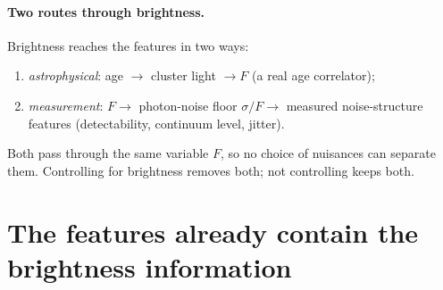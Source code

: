\documentclass[11pt]{article}
\begin{document}
\paragraph{Two routes through brightness.}
Brightness reaches the features in two ways:
\begin{enumerate}
  \item \emph{astrophysical}: age $\to$ cluster light $\to F$ (a real age correlator);
  \item \emph{measurement}: $F \to$ photon-noise floor $\sigma/F \to$ measured noise-structure
        features (detectability, continuum level, jitter).
\end{enumerate}
Both pass through the same variable $F$, so no choice of nuisances can separate them.
Controlling for brightness removes both; not controlling keeps both.

\section{The features already contain the brightness information}
\end{document}

